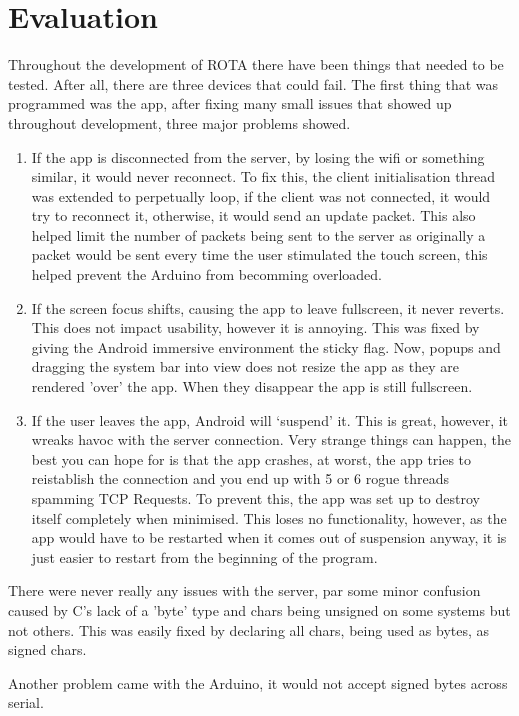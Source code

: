 \section{Evaluation}
\par Throughout the development of ROTA there have been things that needed to be tested.
After all, there are three devices that could fail. The first thing that was programmed was
the app, after fixing many small issues that showed up throughout development, three major
problems showed.  
\begin{enumerate}
  \item If the app is disconnected from the server, by losing the wifi or something
  similar, it would never reconnect. To fix this, the client initialisation thread was
  extended to perpetually loop, if the client was not connected, it would try to reconnect it,
  otherwise, it would send an update packet. This also helped limit the number of packets
  being sent to the server as originally a packet would be sent every time the user
  stimulated the touch screen, this helped prevent the Arduino from becomming overloaded.
  \item If the screen focus shifts, causing the app to leave fullscreen, it never reverts.
  This does not impact usability, however it is annoying. This was fixed by giving the
  Android immersive environment the sticky flag. Now, popups and dragging the system bar into
  view does not resize the app as they are rendered 'over' the app. When they disappear
  the app is still fullscreen.
  \item If the user leaves the app, Android will `suspend' it. This is great, however,
  it wreaks havoc with the server connection. Very strange things can happen, the best
  you can hope for is that the app crashes, at worst, the app tries to reistablish the
  connection and you end up with 5 or 6 rogue threads spamming TCP Requests.
  To prevent this, the app was set up to destroy itself completely when minimised. This
  loses no functionality, however, as the app would have to be restarted when it comes
  out of suspension anyway, it is just easier to restart from the beginning of the program.
\end{enumerate}
There were never really any issues with the server, par some minor confusion caused by
C's lack of a 'byte' type and chars being unsigned on some systems but not others.
This was easily fixed by declaring all chars, being used as bytes, as signed chars.
\par
Another problem came with the Arduino, it would not accept signed bytes across serial.
